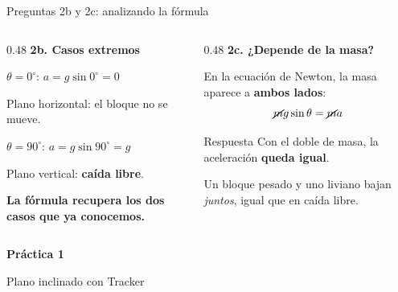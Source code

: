 \documentclass[aspectratio=169,xcolor=dvipsnames]{beamer}
\begin{document}
	\begin{frame}{Preguntas 2b y 2c: analizando la fórmula}
		\begin{columns}[T]
			\begin{column}{0.48\textwidth}
				\textbf{2b. Casos extremos}
				
				\vspace{0.2cm}
				\small
				$\theta = 0^\circ$: \quad $a = g\sin 0^\circ = 0$
				
				\hspace{1.2cm}Plano horizontal: el bloque no se mueve.
				
				\vspace{0.3cm}
				$\theta = 90^\circ$: \quad $a = g\sin 90^\circ = g$
				
				\hspace{1.3cm}Plano vertical: \textbf{caída libre}.
				
				\vspace{0.4cm}
				\begin{center}
					\textcolor{UnalGreen}{\textbf{La fórmula recupera los dos casos que ya conocemos.}}
				\end{center}
			\end{column}
			\begin{column}{0.48\textwidth}
				\textbf{2c. ¿Depende de la masa?}
				
				\vspace{0.2cm}
				\small
				En la ecuación de Newton, la masa aparece a \textbf{ambos lados}:
				\[
				\cancel{m}g\sin\theta = \cancel{m}a
				\]
				
				\begin{exampleblock}{Respuesta}
					\centering
					Con el doble de masa, la aceleración \textbf{queda igual}.
				\end{exampleblock}
				
				\vspace{0.2cm}
				Un bloque pesado y uno liviano bajan \emph{juntos}, igual que en
				caída libre.
			\end{column}
		\end{columns}
	\end{frame}
	
	\begin{frame}
		\begin{center}
			\vspace{1cm}
			{\Huge\bfseries\color{UnalGreen} Práctica 1}
			
			\vspace{0.5cm}
			\large Plano inclinado con Tracker
		\end{center}
	\end{frame}
	
\end{document}
